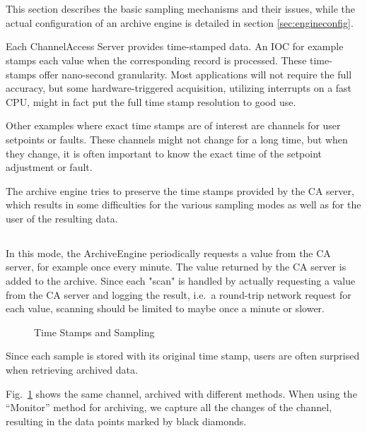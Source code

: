 \section{} \label{sec:sampling} %
This section describes the basic sampling mechanisms and their issues,
while the actual configuration of an archive engine is detailed in section
\ref{sec:engineconfig}.

Each ChannelAccess Server provides time-stamped data. An IOC for
example stamps each value when the corresponding record is
processed.  These time-stamps offer nano-second granularity. Most
applications will not require the full accuracy, but some
hardware-triggered acquisition, utilizing interrupts on a fast CPU,
might in fact put the full time stamp resolution to good use.

Other examples where exact time stamps are of interest are channels
for user setpoints or faults. These channels might not change for a
long time, but when they change, it is often important to know the
exact time of the setpoint adjustment or fault.

The archive engine tries to preserve the time stamps provided by
the CA server, which results in some difficulties for the various
sampling modes as well as for the user of the resulting data.

\subsection{}
In this mode, the ArchiveEngine periodically requests a value from
the CA server, for example once every minute. The value returned by
the CA server is added to the archive. Since each "scan" is handled
by actually requesting a value from the CA server and logging the
result, i.e.\ a round-trip network request for each value,
scanning should be limited to maybe once a minute or slower.

\begin{figure}[htb]
\begin{center}
\end{center}
\caption{\label{fig:times}Time Stamps and Sampling}
\end{figure}

Since each sample is stored with its original time stamp, 
users are often surprised when retrieving archived data.

Fig.~\ref{fig:times} shows the same channel, archived with different methods.
When using the ``Monitor'' method for archiving, we capture all the
changes of the channel, resulting in the data points marked by black
diamonds.

